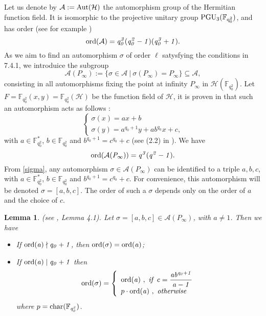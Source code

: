 \documentclass[10pt]{article}
\newtheorem{lem1}{Lemma}[]
\newcommand{\s}{\vspace{0.3cm}}
\newcommand{\cd}{\cdot}
\newcommand{\calA}{\mathcal{A}}
\newcommand{\calH}{\mathcal{H}}
\newcommand{\su}{\subseteq}
\begin{document}
Let us denote by $\calA := \rm Aut(\calH)$ the automorphism group of the Hermitian function field. It is isomorphic to the projective unitary group $\rm PGU_3(\mathbb{F}_{q_0^2})$, and has order (see for example \cite{Sti})
\[\rm ord \it (\calA) = q_0^3(q_0^2-1)(q_0^3+1).\]
As we aim to find an automorphism $\sigma$ of order $\ell$ satysfying the conditions in 7.4.1, we introduice the subgroup
\[\calA(P_{\infty}) := \{ \sigma \in \calA \ | \ \sigma(P_{\infty}) = P_{\infty}\} \su \calA ,\]
consisting in all automorphisms fixing the point at infinity $P_{\infty}$ in $\calH(\mathbb{F}_{q_0^2})$. Let $F=\mathbb{F}_{q_0^2}(x,y)=\mathbb{F}_{q_0^2}(\calH)$ be the function field of $\calH$, it is proven in \cite{Gar} that such an automorphism acts as follows :
\begin{equation} \label{sigma}
\left\{ \begin{array}{ll}
\sigma(x) = ax+b \\
\sigma(y) = a^{q_0+1}y+ab^{q_0}x+c,
\end{array} \right.
\end{equation}
with $a \in \mathbb{F}_{q_0^2}^*$, $b \in \mathbb{F}_{q_0^2}$ and $b^{q_0+1} = c^{q_0}+c$ (see (2.2) in \cite{Gar}). We have 
\[\rm ord \it (\calA(P_{\infty})) = q^3(q^2-1).\]
From \ref{sigma}, any automorphism $\sigma \in \calA(P_{\infty})$ can be identified to a triple $a,b,c$, with $a \in \mathbb{F}_{q_0^2}^*$, $b \in \mathbb{F}_{q_0^2}$ and $b^{q_0+1} = c^{q_0}+c$. For convenience, this automorphism will be denoted $\sigma = [a,b,c]$. The order of such a $\sigma$ depends only on the order of $a$ and the choice of $c$.

\s

\begin{lem1} \rm (see \cite{Gar}, Lemma 4.1). \it \label{ordsigma}
Let $\sigma = [a,b,c] \in \calA(P_{\infty})$, with $a \neq 1$. Then we have
\begin{itemize}
\item[(i)] If $\rm ord \it (a) \nmid q_0+1$, then $\rm ord \it (\sigma) = \rm ord \it (a)$;
\item[(ii)] If $\rm ord \it (a) \mid q_0+1$ then
\begin{equation*}
\rm ord \it (\sigma) = \left\{ \begin{array}{ll}
\rm ord \it (a) \ , \ if \ c=\dfrac{ab^{q_0+1}}{a-1} \\
p \cd \rm ord \it (a) \ , \  otherwise \ 
\end{array}
\right.
\end{equation*}
where $p=\rm char \it (\mathbb{F}_{q_0^2})$.
\end{itemize}
\end{lem1}
\end{document}
